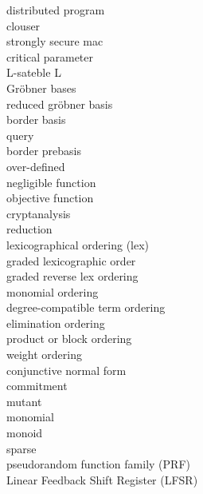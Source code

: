 \begin{latin}
distributed program\dotfill {}\\
clouser\dotfill {}\\
strongly secure mac\dotfill {}\\
critical parameter\dotfill {}\\
L-sateble \dotfill {}L\\
Gr\"{o}bner bases\dotfill {}\\
reduced gr\"{o}bner basis\dotfill {}\\
border basis\dotfill {}\\
query\dotfill {}\\
border prebasis\dotfill {}\\
over-defined\dotfill {}\\
negligible function\dotfill {}\\
objective function\dotfill {}\\
cryptanalysis\dotfill {}\\
reduction\dotfill {}\\
lexicographical ordering (lex)\dotfill {}\\
graded lexicographic order\dotfill {}\\
graded reverse lex ordering \dotfill {}\\
monomial ordering\dotfill {}\\
degree-compatible term ordering\dotfill {}\\
elimination ordering\dotfill {}\\
product or block ordering\dotfill {}\\
weight ordering\dotfill {}\\
conjunctive normal form\dotfill {}\\
commitment\dotfill {}\\
mutant\dotfill {}\\
monomial\dotfill {}\\
monoid\dotfill {}\\
sparse\dotfill {}\\
pseudorandom function family (PRF)\dotfill {}\\
Linear Feedback Shift Register (LFSR)\dotfill {}\\

\end{latin}
